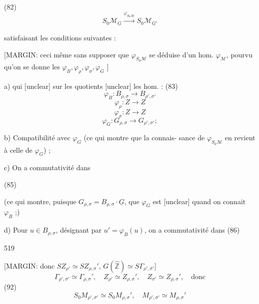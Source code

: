 \begin{enumerate}
(82) $$ S_0\mathcal{M}_{\underline{G}} \xrightarrow{\varphi_{S_0\mathcal{M}}} S_0\mathcal{M}_{\underline{G}'} $$

satisfaisant les conditions suivantes :

[MARGIN:
ceci même sans
supposer que
$\varphi_{S_0 \mathcal{M}}$ se déduise
d'un hom.
$\varphi_{\mathcal{M}}$,
pourvu qu'on
se donne les
$\varphi_B, \varphi_\rho, \varphi_\sigma, \varphi_G$
]

a) qui [unclear] sur les quotients [unclear] les hom. :
(83)
$$ \varphi_B : B_{\rho, \sigma} \to B_{\rho', \sigma'} $$
$$ \varphi_\rho : Z \to Z $$
$$ \varphi_\sigma : Z \to Z $$
$$ \varphi_G : G_{\rho, \sigma} \to G_{\rho', \sigma'} ; $$

b) Compatibilité avec $\varphi_G$ (ce qui montre que la connais-
sance de $\varphi_{S_0 \mathcal{M}}$ en revient à celle de $\varphi_G$) ;

c) On a commutativité dans

(85)

(ce qui montre, puisque $G_{\rho, \sigma} = B_{\rho, \sigma} \cdot \underline{G}$, que
$\varphi_G$ est [unclear] quand on connait $\varphi_B$ ;)

d) Pour $u \in B_{\rho, \sigma}$, désignant par $u' = \varphi_B(u)$, on a
commutativité dans
(86)

519

\newpage



\newpage


[MARGIN: donc $S Z_{\rho'} \simeq S Z_{\rho,\sigma}'$, $G(\hat{\mathbb{Z}}) \simeq S \Gamma_{\rho',\sigma'}$]
$$ \Gamma_{\rho',\sigma'} \simeq \Gamma_{\rho,\sigma}', \quad Z_{\rho'} \simeq Z_{\rho,\sigma}', \quad Z_{\sigma'} \simeq Z_{\rho,\sigma}', \quad \text{donc} $$
(92) $$ S_0 M_{\rho',\sigma'} \simeq S_0 M_{\rho,\sigma}', \quad M_{\rho',\sigma'} \simeq M_{\rho,\sigma}' $$


\end{enumerate}
